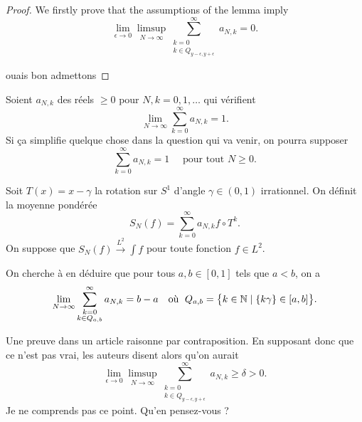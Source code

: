 \documentclass[12pt,a4paper]{article}
\begin{document}
\begin{proof}
We firstly prove that the assumptions of the lemma imply
$$
\lim_{\epsilon \to 0} \limsup_{N \to \infty} 
\sum_{\substack{k=0 \\ k \in Q_{y-\epsilon,y+\epsilon}}}^\infty a_{N,k} = 0. 
$$

ouais bon admettons 

\end{proof}

\newpage

Soient $a_{N,k}$ des réels $\geq 0$ pour $N,k = 0, 1, \ldots$ qui vérifient 
$$
\lim_{N \to \infty} \sum_{k=0}^\infty a_{N,k} =1. 
$$
Si ça simplifie quelque chose dans la question qui va venir, on pourra supposer 
$$
\sum_{k=0}^\infty a_{N,k} =1 \quad \text{ pour tout $N \geq 0$}.
$$


Soit $T(x)=x-\gamma$ la rotation sur $S^1$ d'angle $\gamma \in (0,1)$ irrationnel.
On définit la moyenne pondérée 
$$
S_N(f) = \sum_{k=0}^\infty a_{N,k} f \circ T^k.
$$
On suppose que 
$S_N(f) \overset{L^2}{\longrightarrow} \int f$ pour toute fonction $f \in L^2$. 

On cherche à en déduire que pour tous $a,b \in [0,1]$ tels que $a < b$, on a
$$
\lim_{N \to \infty} \sum_{\substack{k=0 \\ k \in Q_{a,b}}}^\infty a_{N,k} = b-a 
\quad \text{où }\;  
Q_{a,b} = \bigl\{k \in \mathbb{N} \mid \{k\gamma\} \in [a,b] \bigr\}.  
$$

Une preuve dans un article raisonne par contraposition. 
En supposant donc que ce n'est pas vrai, les auteurs disent alors qu'on aurait 
$$
\lim_{\epsilon \to 0} \limsup_{N \to \infty} 
\sum_{\substack{k=0 \\ k \in Q_{y-\epsilon,y+\epsilon}}}^\infty a_{N,k} 
\geq \delta >0.
$$
Je ne comprends pas ce point. Qu'en pensez-vous ?
\end{document}
